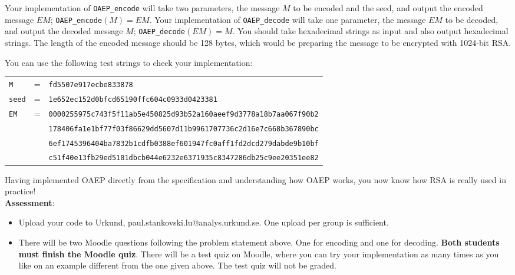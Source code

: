 \documentclass{article}
\begin{document}
\begin{description}
{    Your implementation of \texttt{OAEP\_encode} will take two parameters, the message $M$ to be encoded and the seed, and output the encoded message $EM$; \texttt{OAEP\_encode}$(M)=EM$.
    Your implementation of \texttt{OAEP\_decode} will take one parameter, the message $EM$ to be decoded, and output the decoded message $M$; \texttt{OAEP\_decode}$(EM)=M$. You should take hexadecimal strings as input and also output hexadecimal strings. The length of the encoded message should be 128 bytes, which would be preparing the message to be encrypted with 1024-bit RSA. 
    
    You can use the following test strings to check your implementation:
    \begin{center}
    \begin{tabular}{lcl}
	\texttt{M} & = & \texttt{fd5507e917ecbe833878}\\
    \texttt{seed} & = & \texttt{1e652ec152d0bfcd65190ffc604c0933d0423381}\\
    \texttt{EM} &=& \texttt{0000255975c743f5f11ab5e450825d93b52a160aeef9d3778a18b7aa067f90b2}\\                                 &&\texttt{178406fa1e1bf77f03f86629dd5607d11b9961707736c2d16e7c668b367890bc}\\
    &&\texttt{6ef1745396404ba7832b1cdfb0388ef601947fc0aff1fd2dcd279dabde9b10bf}\\
   && \texttt{c51f40e13fb29ed5101dbcb044e6232e6371935c8347286db25c9ee20351ee82}\\
    \end{tabular}
    \end{center}
    
    Having implemented OAEP directly from the specification and understanding how OAEP works, you now know how RSA is really used in practice!\\
    \textbf{Assessment}:
	\begin{itemize}
		\item Upload your code to Urkund, paul.stankovski.lu@analys.urkund.se.
        One upload per group is sufficient.
		\item There will be two Moodle questions following the problem statement above. One for encoding and one for decoding. 
        \textbf{Both students must finish the Moodle quiz}.
        There will be a test quiz on Moodle, where you can try your implementation as many times as you like on an example different from the one given above. The test quiz will not be graded.
	\end{itemize}

    
    }
\end{description}
\end{document}
